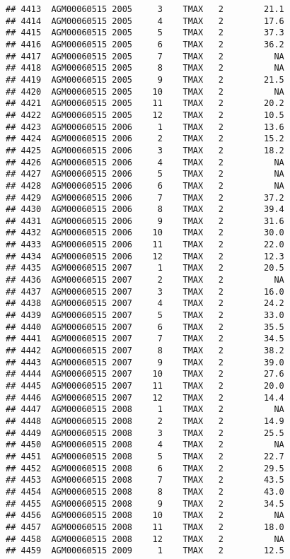 \documentclass{article}\usepackage[]{graphicx}\usepackage[]{color}
\makeatletter
\newenvironment{kframe}{%
 \def\at@end@of@kframe{}%
 \ifinner\ifhmode%
  \def\at@end@of@kframe{\end{minipage}}%
  \begin{minipage}{\columnwidth}%
 \fi\fi%
 \def\FrameCommand##1{\hskip\@totalleftmargin \hskip-\fboxsep
 \colorbox{shadecolor}{##1}\hskip-\fboxsep
     \hskip-\linewidth \hskip-\@totalleftmargin \hskip\columnwidth}%
 \MakeFramed {\advance\hsize-\width
   \@totalleftmargin\z@ \linewidth\hsize
   \@setminipage}}%
 {\par\unskip\endMakeFramed%
 \at@end@of@kframe}
\newenvironment{knitrout}{}{} %
\makeatother
\begin{document}
\begin{knitrout}
\begin{kframe}
\begin{verbatim}
## 4413  AGM00060515 2005     3    TMAX   2        21.1
## 4414  AGM00060515 2005     4    TMAX   2        17.6
## 4415  AGM00060515 2005     5    TMAX   2        37.3
## 4416  AGM00060515 2005     6    TMAX   2        36.2
## 4417  AGM00060515 2005     7    TMAX   2          NA
## 4418  AGM00060515 2005     8    TMAX   2          NA
## 4419  AGM00060515 2005     9    TMAX   2        21.5
## 4420  AGM00060515 2005    10    TMAX   2          NA
## 4421  AGM00060515 2005    11    TMAX   2        20.2
## 4422  AGM00060515 2005    12    TMAX   2        10.5
## 4423  AGM00060515 2006     1    TMAX   2        13.6
## 4424  AGM00060515 2006     2    TMAX   2        15.2
## 4425  AGM00060515 2006     3    TMAX   2        18.2
## 4426  AGM00060515 2006     4    TMAX   2          NA
## 4427  AGM00060515 2006     5    TMAX   2          NA
## 4428  AGM00060515 2006     6    TMAX   2          NA
## 4429  AGM00060515 2006     7    TMAX   2        37.2
## 4430  AGM00060515 2006     8    TMAX   2        39.4
## 4431  AGM00060515 2006     9    TMAX   2        31.6
## 4432  AGM00060515 2006    10    TMAX   2        30.0
## 4433  AGM00060515 2006    11    TMAX   2        22.0
## 4434  AGM00060515 2006    12    TMAX   2        12.3
## 4435  AGM00060515 2007     1    TMAX   2        20.5
## 4436  AGM00060515 2007     2    TMAX   2          NA
## 4437  AGM00060515 2007     3    TMAX   2        16.0
## 4438  AGM00060515 2007     4    TMAX   2        24.2
## 4439  AGM00060515 2007     5    TMAX   2        33.0
## 4440  AGM00060515 2007     6    TMAX   2        35.5
## 4441  AGM00060515 2007     7    TMAX   2        34.5
## 4442  AGM00060515 2007     8    TMAX   2        38.2
## 4443  AGM00060515 2007     9    TMAX   2        39.0
## 4444  AGM00060515 2007    10    TMAX   2        27.6
## 4445  AGM00060515 2007    11    TMAX   2        20.0
## 4446  AGM00060515 2007    12    TMAX   2        14.4
## 4447  AGM00060515 2008     1    TMAX   2          NA
## 4448  AGM00060515 2008     2    TMAX   2        14.9
## 4449  AGM00060515 2008     3    TMAX   2        25.5
## 4450  AGM00060515 2008     4    TMAX   2          NA
## 4451  AGM00060515 2008     5    TMAX   2        22.7
## 4452  AGM00060515 2008     6    TMAX   2        29.5
## 4453  AGM00060515 2008     7    TMAX   2        43.5
## 4454  AGM00060515 2008     8    TMAX   2        43.0
## 4455  AGM00060515 2008     9    TMAX   2        34.5
## 4456  AGM00060515 2008    10    TMAX   2          NA
## 4457  AGM00060515 2008    11    TMAX   2        18.0
## 4458  AGM00060515 2008    12    TMAX   2          NA
## 4459  AGM00060515 2009     1    TMAX   2        12.5

\end{verbatim}
\end{kframe}
\end{knitrout}
\end{document}
